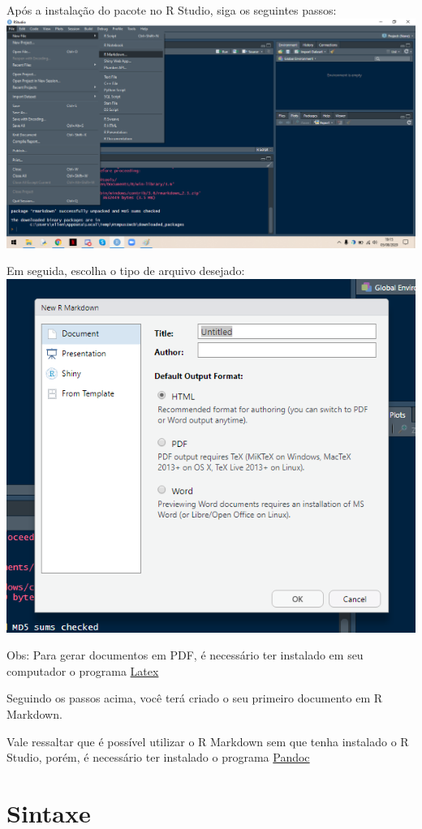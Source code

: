 \documentclass[
]{book}
\begin{document}
Após a instalação do pacote no R Studio, siga os seguintes passos:
\includegraphics{img/new.png}

Em seguida, escolha o tipo de arquivo desejado:
\includegraphics{img/file.png}

Obs: Para gerar documentos em PDF, é necessário ter instalado em seu computador o programa \href{https://miktex.org/}{Latex}

Seguindo os passos acima, você terá criado o seu primeiro documento em R Markdown.

Vale ressaltar que é possível utilizar o R Markdown sem que tenha instalado o R Studio, porém, é necessário ter instalado o programa \href{https://pandoc.org}{Pandoc}

\hypertarget{sintaxe}{%
\chapter{Sintaxe}\label{sintaxe}}
\end{document}
